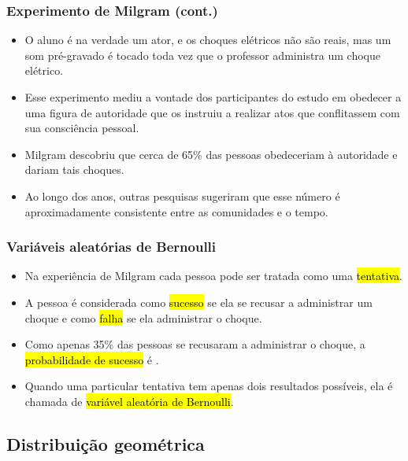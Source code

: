 
\begin{frame}
\frametitle{Experimento de Milgram (cont.)}

\begin{itemize}
\justifying
\item O aluno é na verdade um ator, e os choques elétricos não são reais, mas um som pré-gravado é tocado toda vez que o professor administra um choque elétrico.
\justifying
\item Esse experimento mediu a vontade dos participantes do estudo em obedecer a uma figura de autoridade que os instruiu a realizar atos que conflitassem com sua consciência pessoal.
\justifying
\item Milgram descobriu que cerca de 65\% das pessoas obedeceriam à autoridade e dariam tais choques.
\justifying
\item Ao longo dos anos, outras pesquisas sugeriram que esse número é aproximadamente consistente entre as comunidades e o tempo.

\end{itemize}

\end{frame}



\begin{frame}
\frametitle{Variáveis aleatórias de Bernoulli}

\begin{itemize}
\justifying
\item Na experiência de Milgram cada pessoa pode ser tratada como uma \hl{tentativa}.
\justifying
\item A pessoa é considerada como \hl{sucesso} se ela se recusar a administrar um choque e como \hl{falha} se ela administrar o choque.
\justifying
\item Como apenas 35\% das pessoas se recusaram a administrar o choque, a \hl{probabilidade de sucesso} é .
\justifying
\item Quando uma particular tentativa tem apenas dois resultados possíveis, ela é chamada de \hl{variável aleatória de Bernoulli}.

\end{itemize}

\end{frame}


\subsection{Distribuição geométrica}

